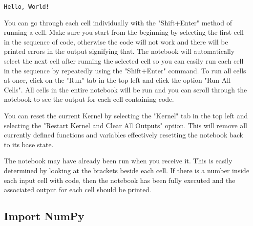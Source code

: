 \documentclass[11pt]{article}
\begin{document}
    \begin{Verbatim}[commandchars=\\\{\}]
Hello, World!
    \end{Verbatim}
You can go through each cell individually with the "Shift+Enter" method of running a cell. Make sure you start from the beginning by selecting the first cell in the sequence of code, otherwise the code will not work and there will be printed errors in the output signifying that. The notebook will automatically select the next cell after running the selected cell so you can easily run each cell in the sequence by repeatedly using the "Shift+Enter" command. To run all cells at once, click on the "Run" tab in the top left and click the option "Run All Cells". All cells in the entire notebook will be run and you can scroll through the notebook to see the output for each cell containing code. 

You can reset the current Kernel by selecting the "Kernel" tab in the top left and selecting the "Restart Kernel and Clear All Outputs" option. This will remove all currently defined functions and variables effectively resetting the notebook back to its base state.

The notebook may have already been run when you receive it. This is easily determined by looking at the brackets beside each cell. If there is a number inside each input cell with code, then the notebook has been fully executed and the associated output for each cell should be printed.
    \hypertarget{import-numpy}{%
\subsection{Import NumPy}\label{import-numpy}}
\end{document}
